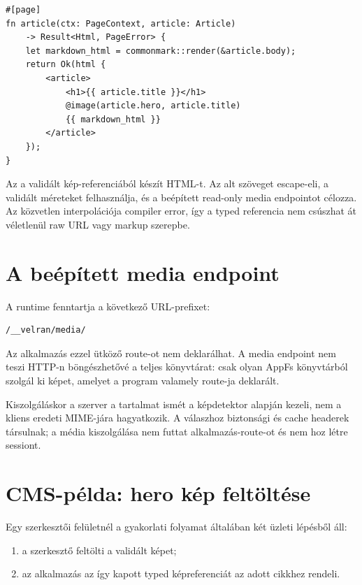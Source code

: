\begin{lstlisting}[language=Velran]
#[page]
fn article(ctx: PageContext, article: Article)
    -> Result<Html, PageError> {
    let markdown_html = commonmark::render(&article.body);
    return Ok(html {
        <article>
            <h1>{{ article.title }}</h1>
            @image(article.hero, article.title)
            {{ markdown_html }}
        </article>
    });
}
\end{lstlisting}

Az  a validált kép-referenciából készít HTML-t. Az alt szöveget escape-eli, a validált méreteket felhasználja, és a beépített read-only media endpointot célozza. Az  közvetlen  interpolációja compiler error, így a typed referencia nem csúszhat át véletlenül raw URL vagy markup szerepbe.

\section{A beépített media endpoint}

A runtime fenntartja a következő URL-prefixet:

\begin{lstlisting}
/__velran/media/
\end{lstlisting}

Az alkalmazás ezzel ütköző route-ot nem deklarálhat. A media endpoint nem teszi HTTP-n böngészhetővé a teljes  könyvtárat: csak olyan AppFs könyvtárból szolgál ki képet, amelyet a program valamely  route-ja deklarált.

Kiszolgáláskor a szerver a tartalmat ismét a képdetektor alapján kezeli, nem a kliens eredeti MIME-jára hagyatkozik. A válaszhoz biztonsági és cache headerek társulnak; a média kiszolgálása nem futtat alkalmazás-route-ot és nem hoz létre sessiont.

\section{CMS-példa: hero kép feltöltése}

Egy szerkesztői felületnél a gyakorlati folyamat általában két üzleti lépésből áll:

\begin{enumerate}
  \item a szerkesztő feltölti a validált képet;
  \item az alkalmazás az így kapott typed képreferenciát az adott cikkhez rendeli.
\end{enumerate}

